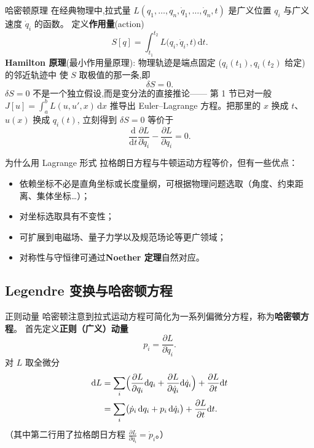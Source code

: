 \documentclass[fontset=windows, chinese, 10pt, xcolor=dvipsnames]{beamer}
\begin{document}
\begin{frame}{哈密顿原理}
  在经典物理中,拉式量
  $L(q_1,\dots,q_n,\dot q_1,\dots,\dot q_n,t)$
  是广义位置 $q_i$ 与广义速度 $\dot q_i$ 的函数。
  定义\textbf{作用量}(action)
  \begin{equation*}
    S[q] = \int_{t_1}^{t_2} L\bigl(q_i,\dot q_i,t\bigr)\,\mathrm{d}t.
  \end{equation*}
  \textbf{Hamilton 原理}(最小作用量原理):
  物理轨迹是端点固定 ($q_i(t_1),q_i(t_2)$ 给定) 的邻近轨迹中
  使 $S$ 取极值的那一条,即
  \begin{equation*}
    \delta S = 0.
  \end{equation*}
  $\delta S=0$ 不是一个独立假设,而是变分法的直接推论——
  第 1 节已对一般 $J[u]=\int_a^b L(u,u',x)\,\mathrm{d}x$ 推导出
  Euler--Lagrange 方程。把那里的 $x$ 换成 $t$、$u(x)$ 换成 $q_i(t)$,
  立刻得到 $\delta S=0$ 等价于
  \begin{equation*}
    \frac{\mathrm{d}}{\mathrm{d}t}\frac{\partial L}{\partial \dot q_i}
    - \frac{\partial L}{\partial q_i} = 0.
  \end{equation*}
\end{frame}

\begin{frame}{为什么用 Lagrange 形式}
  拉格朗日方程与牛顿运动方程等价，但有一些优点：
  \begin{itemize}
    \item 依赖坐标不必是直角坐标或长度量纲，可根据物理问题选取（角度、约束距离、集体坐标\ldots）；
    \item 对坐标选取具有不变性；
    \item 可扩展到电磁场、量子力学以及规范场论等更广领域；
    \item 对称性与守恒律可通过\textbf{Noether 定理}自然对应。
  \end{itemize}
\end{frame}

\subsection{Legendre 变换与哈密顿方程}

\begin{frame}{正则动量}
  哈密顿注意到拉式运动方程可简化为一系列偏微分方程，称为\textbf{哈密顿方程}。
  首先定义\textbf{正则（广义）动量}
  \begin{equation*}
    p_i = \frac{\partial L}{\partial \dot q_i}.
  \end{equation*}
  对 $L$ 取全微分
  \begin{align*}
    \mathrm{d} L
    &= \sum_i\Bigl(\frac{\partial L}{\partial q_i}\mathrm{d}q_i
                  + \frac{\partial L}{\partial \dot q_i}\mathrm{d}\dot q_i\Bigr)
       + \frac{\partial L}{\partial t}\mathrm{d}t \\
    &= \sum_i\bigl(\dot p_i\,\mathrm{d}q_i + p_i\,\mathrm{d}\dot q_i\bigr)
       + \frac{\partial L}{\partial t}\mathrm{d}t.
  \end{align*}
  （其中第二行用了拉格朗日方程 $\frac{\partial L}{\partial q_i} = \dot p_i$。）
\end{frame}
\end{document}
